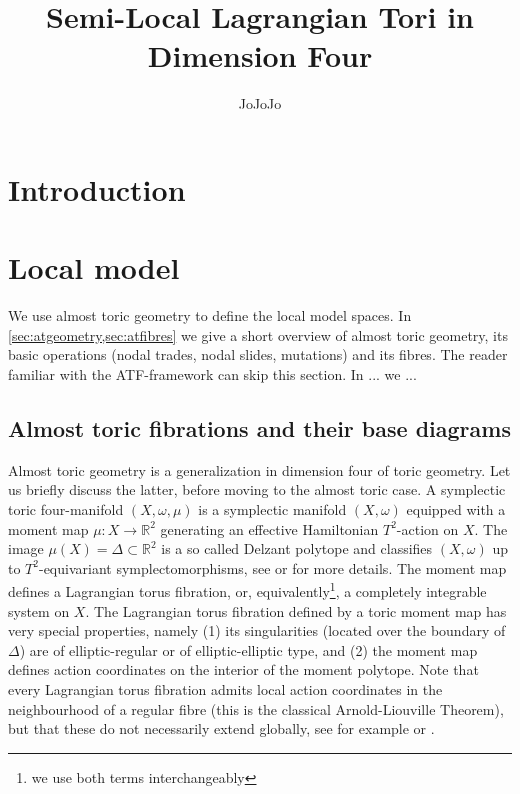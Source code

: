 \documentclass[12pt,a4paper,draft]{scrartcl}
\begin{document}
\title{Semi-Local Lagrangian Tori in Dimension Four}
\author{JoJoJo}

\maketitle

\section{Introduction}

\section{Local model}

We use almost toric geometry to define the local model spaces.
In \cref{sec:atgeometry,sec:atfibres} we give a short overview of almost toric geometry, its basic operations (nodal trades, nodal slides, mutations) and its fibres.
The reader familiar with the ATF-framework can skip this section.
In ... we ...


\subsection{Almost toric fibrations and their base diagrams}
\label{sec:atgeometry}

Almost toric geometry is a generalization in dimension four of toric geometry.
Let us briefly discuss the latter, before moving to the almost toric case.
A symplectic toric four-manifold $(X,\omega,\mu)$ is a symplectic manifold $(X,\omega)$ equipped with a moment map $\mu \colon X \rightarrow \mathbb{R}^2$ generating an effective Hamiltonian $T^2$-action on $X$. The image $\mu(X) = \Delta \subset \mathbb{R}^2$ is a so called Delzant polytope and classifies $(X,\omega)$ up to $T^2$-equivariant symplectomorphisms, see \cite{Del88} or \cite{Can03} for more details.
The moment map defines a Lagrangian torus fibration, or, equivalently\footnote{we use both terms interchangeably}, a completely integrable system on $X$. The Lagrangian torus fibration defined by a toric moment map has very special properties, namely (1) its singularities (located over the boundary of $\Delta$) are of elliptic-regular or of elliptic-elliptic type, and (2) the moment map defines action coordinates on the interior of the moment polytope.
Note that every Lagrangian torus fibration admits local action coordinates in the neighbourhood of a regular fibre (this is the classical Arnold-Liouville Theorem), but that these do not necessarily extend globally, see for example \cite{Dui80} or \cite{Zun96,Zun03}.
\end{document}
